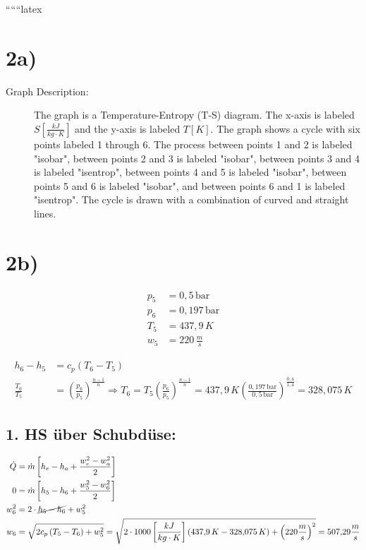 
``````latex


\section*{2a)}

\begin{description}
    \item[Graph Description:] The graph is a Temperature-Entropy (T-S) diagram. The x-axis is labeled $S \left[ \frac{kJ}{kg \cdot K} \right]$ and the y-axis is labeled $T \left[ K \right]$. The graph shows a cycle with six points labeled 1 through 6. The process between points 1 and 2 is labeled "isobar", between points 2 and 3 is labeled "isobar", between points 3 and 4 is labeled "isentrop", between points 4 and 5 is labeled "isobar", between points 5 and 6 is labeled "isobar", and between points 6 and 1 is labeled "isentrop". The cycle is drawn with a combination of curved and straight lines.
\end{description}

\section*{2b)}

\begin{align*}
    p_5 &= 0{,}5 \, \text{bar} \\
    p_6 &= 0{,}197 \, \text{bar} \\
    T_5 &= 437{,}9 \, K \\
    w_5 &= 220 \, \frac{m}{s}
\end{align*}

\begin{align*}
    h_6 - h_5 &= c_p \left( T_6 - T_5 \right) \\
    \frac{T_6}{T_5} &= \left( \frac{p_6}{p_5} \right)^{\frac{n-1}{n}} \Rightarrow T_6 = T_5 \left( \frac{p_6}{p_5} \right)^{\frac{n-1}{n}} = 437{,}9 \, K \left( \frac{0{,}197 \, \text{bar}}{0{,}5 \, \text{bar}} \right)^{\frac{0{,}4}{1{,}4}} = 328{,}075 \, K
\end{align*}

\subsection*{1. HS über Schubdüse:}

\begin{align*}
    \dot{Q} &= \dot{m} \left[ h_e - h_a + \frac{w_e^2 - w_a^2}{2} \right] \\
    0 &= \dot{m} \left[ h_5 - h_6 + \frac{w_5^2 - w_6^2}{2} \right] \\
    w_6^2 &= 2 \cdot \cancel{h_5 - h_6} + w_5^2 \\
    w_6 &= \sqrt{2 c_p \left( T_5 - T_6 \right) + w_5^2} = \sqrt{2 \cdot 1000 \left[ \frac{kJ}{kg \cdot K} \right] \left( 437{,}9 \, K - 328{,}075 \, K \right) + \left( 220 \frac{m}{s} \right)^2} = 507{,}29 \frac{m}{s}
\end{align*}

